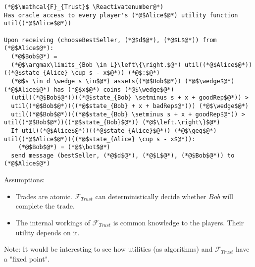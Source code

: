 \Suppressnumber
\begin{lstlisting}[label=trustfunc, style=numbers]
(*@$\mathcal{F}_{Trust}$ \Reactivatenumber@*)
Has oracle access to every player's (*@$Alice$@*) utility function util((*@$Alice$@*))

Upon receiving (chooseBestSeller, (*@$d$@*), (*@$L$@*)) from (*@$Alice$@*):
  (*@$Bob$@*) =
  (*@$\argmax\limits_{Bob \in L}\left\{\right.$@*) util((*@$Alice$@*))((*@$state_{Alice} \cup s - x$@*)) (*@$:$@*)
  (*@$s \in d \wedge s \in$@*) assets((*@$Bob$@*)) (*@$\wedge$@*) (*@$Alice$@*) has (*@$x$@*) coins (*@$\wedge$@*)
  (util((*@$Bob$@*))((*@$state_{Bob} \setminus s + x + goodRep$@*)) >
  util((*@$Bob$@*))((*@$state_{Bob} + x + badRep$@*))) (*@$\wedge$@*)
  util((*@$Bob$@*))((*@$state_{Bob} \setminus s + x + goodRep$@*)) > util((*@$Bob$@*))((*@$state_{Bob}$@*)) (*@$\left.\right\}$@*)
  If util((*@$Alice$@*))((*@$state_{Alice}$@*)) (*@$\geq$@*) util((*@$Alice$@*))((*@$state_{Alice} \cup s - x$@*)):
    (*@$Bob$@*) = (*@$\bot$@*)
  send message (bestSeller, (*@$d$@*), (*@$L$@*), (*@$Bob$@*)) to (*@$Alice$@*)
\end{lstlisting}

Assumptions:
\begin{itemize}
  \item Trades are atomic. $\mathcal{F}_{Trust}$ can deterministically decide whether
  $Bob$ will complete the trade.
  \item The internal workings of $\mathcal{F}_{Trust}$ is common knowledge to the players.
  Their utility depends on it.
\end{itemize}
Note: It would be interesting to see how utilities (as algorithms) and
$\mathcal{F}_{Trust}$ have a "fixed point".
